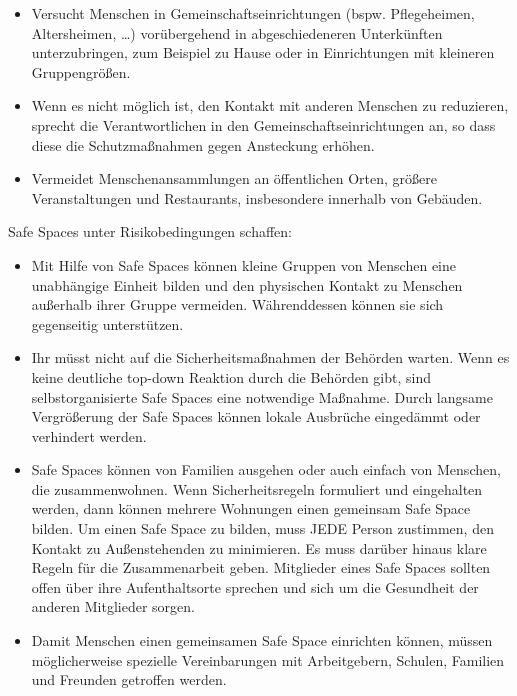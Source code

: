 \documentclass[onecolumn,journal]{IEEEtran}
\begin{document}
\begin{multicols}{2}
\begin{itemize}
\item Versucht Menschen in Gemeinschaftseinrichtungen (bspw. Pflegeheimen, Altersheimen, …) vorübergehend in abgeschiedeneren Unterkünften unterzubringen, zum Beispiel zu Hause oder in Einrichtungen mit kleineren Gruppengrößen.

\item Wenn es nicht möglich ist, den Kontakt mit anderen Menschen zu reduzieren, sprecht die Verantwortlichen in den Gemeinschaftseinrichtungen an, so dass diese die Schutzmaßnahmen gegen Ansteckung erhöhen.

\item Vermeidet Menschenansammlungen an öffentlichen Orten, größere Veranstaltungen und Restaurants, insbesondere innerhalb von Gebäuden.

\end{itemize}

\bigskip

Safe Spaces unter Risikobedingungen schaffen:

\begin{itemize}

\item Mit Hilfe von Safe Spaces können kleine Gruppen von Menschen eine unabhängige Einheit bilden und den physischen Kontakt zu Menschen außerhalb ihrer Gruppe vermeiden. Währenddessen können sie sich gegenseitig unterstützen.

\item Ihr müsst nicht auf die Sicherheitsmaßnahmen der Behörden warten. Wenn es keine deutliche top-down Reaktion durch die Behörden gibt, sind selbstorganisierte Safe Spaces eine notwendige Maßnahme. Durch langsame Vergrößerung der Safe Spaces können lokale Ausbrüche eingedämmt oder verhindert werden.

\item Safe Spaces können von Familien ausgehen oder auch einfach von Menschen, die zusammenwohnen. Wenn Sicherheitsregeln formuliert und eingehalten werden, dann können mehrere Wohnungen einen gemeinsam Safe Space bilden. Um einen Safe Space zu bilden, muss JEDE Person zustimmen, den Kontakt zu Außenstehenden zu minimieren. Es muss darüber hinaus klare Regeln für die Zusammenarbeit geben. Mitglieder eines Safe Spaces sollten offen über ihre Aufenthaltsorte sprechen und sich um die Gesundheit der anderen Mitglieder sorgen.

\item Damit Menschen einen gemeinsamen Safe Space einrichten können, müssen möglicherweise spezielle Vereinbarungen mit Arbeitgebern, Schulen, Familien und Freunden getroffen werden.


\end{itemize}
\end{multicols}
\end{document}
